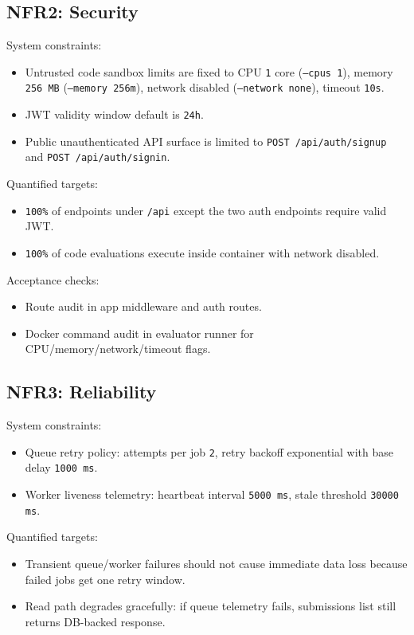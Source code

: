 \documentclass[12pt,journal,onecolumn]{IEEEtran}
\begin{document}
\subsection{NFR2: Security}

System constraints:
\begin{itemize}
    \item Untrusted code sandbox limits are fixed to CPU \texttt{1} core (\texttt{--cpus 1}), memory \texttt{256 MB} (\texttt{--memory 256m}), network disabled (\texttt{--network none}), timeout \texttt{10s}.
    \item JWT validity window default is \texttt{24h}.
    \item Public unauthenticated API surface is limited to \texttt{POST /api/auth/signup} and \texttt{POST /api/auth/signin}.
\end{itemize}

Quantified targets:
\begin{itemize}
    \item \texttt{100\%} of endpoints under \texttt{/api} except the two auth endpoints require valid JWT.
    \item \texttt{100\%} of code evaluations execute inside container with network disabled.
\end{itemize}

Acceptance checks:
\begin{itemize}
    \item Route audit in app middleware and auth routes.
    \item Docker command audit in evaluator runner for CPU/memory/network/timeout flags.
\end{itemize}

\subsection{NFR3: Reliability}

System constraints:
\begin{itemize}
    \item Queue retry policy: attempts per job \texttt{2}, retry backoff exponential with base delay \texttt{1000 ms}.
    \item Worker liveness telemetry: heartbeat interval \texttt{5000 ms}, stale threshold \texttt{30000 ms}.
\end{itemize}

Quantified targets:
\begin{itemize}
    \item Transient queue/worker failures should not cause immediate data loss because failed jobs get one retry window.
    \item Read path degrades gracefully: if queue telemetry fails, submissions list still returns DB-backed response.
\end{itemize}
\end{document}
